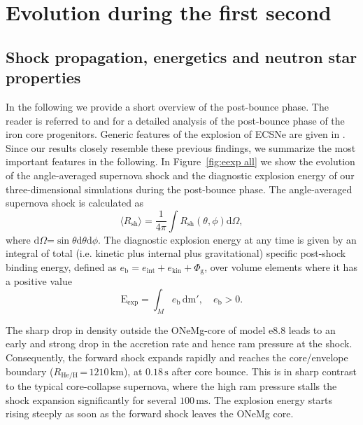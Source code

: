 \documentclass[fleqn,usenatbib]{mnras}
\newcommand{\ud}{\ensuremath{\mathrm{d}}\xspace}
\newcommand{\s}{\ensuremath{\text{s}}}
\newcommand{\onemg}{\ensuremath{\mathrm{e8.8}}\xspace}
\newcommand{\GEO}[1]{{\color{red}#1}}
\begin{document}
\section{Evolution during the first second}
\label{sec:Evolution during the first second}
\subsection{Shock propagation, energetics and neutron star properties}
In the following we provide a short overview of the post-bounce phase. The reader is referred to \cite{Melson2015a} and \cite{Melson2019} for a detailed analysis of the post-bounce phase of the iron core progenitors. Generic features of the explosion of ECSNe are given in \cite{Kitaura2006,Janka2008,Gessner2018}. Since our results closely resemble these previous findings, we \GEO{summarize} the most important features in the following.
In Figure~\ref{fig:eexp all} we show the evolution of the angle-averaged supernova shock and the diagnostic explosion energy of our three-dimensional simulations during the post-bounce phase. 
The angle-averaged supernova shock is calculated as
\begin{equation}
    \langle R_{\mathrm{sh}} \rangle =  \frac{1}{4\pi}\int R_{\mathrm{sh}}(\theta,\phi)\ud \Omega,
    \label{equ:avg rsh}
\end{equation}
where $\ud \Omega\mathord{=}\sin{\theta}\ud\theta\ud\phi$.
The diagnostic explosion energy at any time is given by an integral of total (i.e. kinetic plus internal plus gravitational) specific post-shock binding energy, defined as $e_{\text{b}} = e_{\mathrm{int}} + e_{\mathrm{kin}} + \Phi_{\text{g}}$, over volume elements where it has a positive value 
\begin{equation}
    \mathrm{E}_{\mathrm{exp}} = \int_{M} e_{\mathrm{b}} \, \mathrm{dm'},\quad e_{\mathrm{b}} > 0.
    \label{equ:ene exp}
\end{equation}

The sharp drop in density outside the ONeMg-core of model \onemg leads to an early and strong drop in the accretion rate and hence ram pressure at the shock.
Consequently, the forward shock expands rapidly and reaches the core/envelope boundary ($R_{\mathrm{He/H}}\,\mathord{=}\,1210\,\text{km}$), at $0.18\,\s$ after core bounce.
This is in sharp contrast to the typical core-collapse supernova, where the high ram pressure stalls the shock expansion significantly for several $100\,\text{ms}$. The explosion energy starts rising steeply as soon as the forward shock leaves the ONeMg core.
\end{document}
